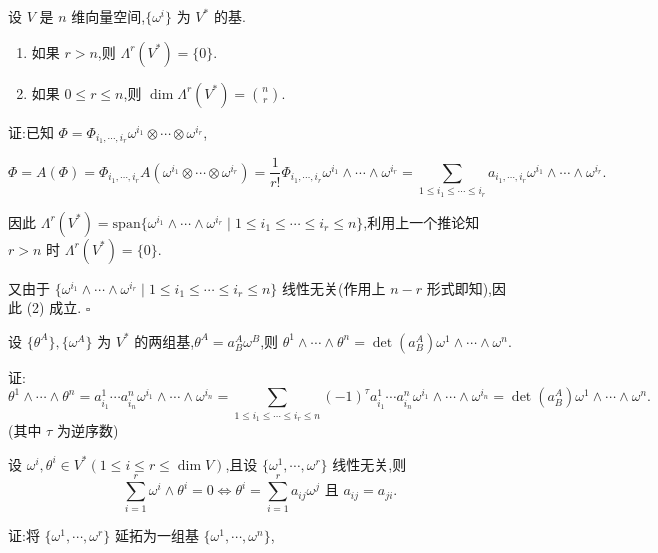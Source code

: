 \begin{corollary}
设 $V$ 是 $n$ 维向量空间,$\{\omega^i\}$ 为 $V^*$ 的基.
\begin{enumerate}
    \item 如果 $r > n$,则 $\Lambda^r(V^*) = \{0\}$.
    \item 如果 $0 \leq r \leq n$,则 $\dim \Lambda^r(V^*) = \binom{n}{r}$.
\end{enumerate}
\end{corollary}

证:已知 $\Phi = \Phi_{i_1, \cdots, i_r} \omega^{i_1} \otimes \cdots \otimes \omega^{i_r}$,

\[
\Phi = A(\Phi) = \Phi_{i_1, \cdots, i_r} A(\omega^{i_1} \otimes \cdots \otimes \omega^{i_r}) = \frac{1}{r!} \Phi_{i_1, \cdots, i_r} \omega^{i_1} \land \cdots \land \omega^{i_r} = \sum_{1 \leq i_1 \leq \cdots \leq i_r} a_{i_1, \cdots, i_r} \omega^{i_1} \land \cdots \land \omega^{i_r}.
\]

因此 $\Lambda^r(V^*) = \text{span}\{\omega^{i_1} \land \cdots \land \omega^{i_r} \mid 1 \leq i_1 \leq \cdots \leq i_r \leq n\}$,利用上一个推论知 $r > n$ 时 $\Lambda^r(V^*) = \{0\}$.

又由于 $\{\omega^{i_1} \land \cdots \land \omega^{i_r} \mid 1 \leq i_1 \leq \cdots \leq i_r \leq n\}$ 线性无关(作用上 $n - r$ 形式即知),因此 (2) 成立. $\square$

\begin{corollary}
设 $\{\theta^A\}, \{\omega^A\}$ 为 $V^*$ 的两组基,$\theta^A = a_B^A \omega^B$,则 $\theta^1 \land \cdots \land \theta^n = \det(a_B^A) \omega^1 \land \cdots \land \omega^n$.
\end{corollary}

证:
\[
\theta^1 \land \cdots \land \theta^n = a_{i_1}^1 \cdots a_{i_n}^n \omega^{i_1} \land \cdots \land \omega^{i_n} = \sum_{1 \leq i_1 \leq \cdots \leq i_r \leq n} (-1)^\tau a_{i_1}^1 \cdots a_{i_n}^n \omega^{i_1} \land \cdots \land \omega^{i_n} = \det(a_B^A) \omega^1 \land \cdots \land \omega^n.
\]
(其中 $\tau$ 为逆序数)

\begin{lemma}[Cartan 引理]
设 $\omega^i, \theta^i \in V^* (1 \leq i \leq r \leq \dim V)$,且设 $\{\omega^1, \cdots, \omega^r\}$ 线性无关,则
\[
\sum_{i=1}^r \omega^i \wedge \theta^i = 0 \iff \theta^i = \sum_{i=1}^r a_{ij} \omega^j \text{ 且 } a_{ij} = a_{ji}.
\]
\end{lemma}

证:将 $\{\omega^1, \cdots, \omega^r\}$ 延拓为一组基 $\{\omega^1, \cdots, \omega^n\}$,

